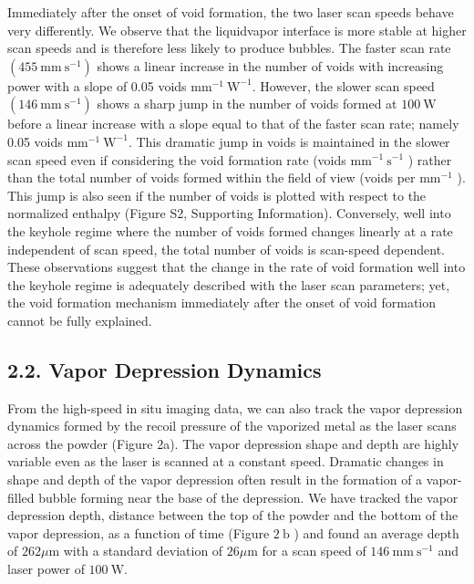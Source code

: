 \documentclass[10pt]{article}
\begin{document}
Immediately after the onset of void formation, the two laser scan speeds behave very differently. We observe that the liquidvapor interface is more stable at higher scan speeds and is therefore less likely to produce bubbles. The faster scan rate $\left(455 \mathrm{~mm} \mathrm{~s}^{-1}\right)$ shows a linear increase in the number of voids with increasing power with a slope of 0.05 voids $\mathrm{mm}^{-1} \mathrm{~W}^{-1}$. However, the slower scan speed $\left(146 \mathrm{~mm} \mathrm{~s}^{-1}\right)$ shows a sharp jump in the number of voids formed at $100 \mathrm{~W}$ before a linear increase with a slope equal to that of the faster scan rate; namely 0.05 voids $\mathrm{mm}^{-1} \mathrm{~W}^{-1}$. This dramatic jump in voids is maintained in the slower scan speed even if considering the void formation rate (voids $\mathrm{mm}^{-1} \mathrm{~s}^{-1}$ ) rather than the total number of voids formed within the field of view (voids per $\mathrm{mm}^{-1}$ ). This jump is also seen if the number of voids is plotted with respect to the normalized enthalpy (Figure S2, Supporting Information). Conversely, well into the keyhole regime where the number of voids formed changes linearly at a rate independent of scan speed, the total number of voids is scan-speed dependent. These observations suggest that the change in the rate of void formation well into the keyhole regime is adequately described with the laser scan parameters; yet, the void formation mechanism immediately after the onset of void formation cannot be fully explained.

\subsection*{2.2. Vapor Depression Dynamics}
From the high-speed in situ imaging data, we can also track the vapor depression dynamics formed by the recoil pressure of the vaporized metal as the laser scans across the powder (Figure 2a). The vapor depression shape and depth are highly variable even as the laser is scanned at a constant speed. Dramatic changes in shape and depth of the vapor depression often result in the formation of a vapor-filled bubble forming near the base of the depression. We have tracked the vapor depression depth, distance between the top of the powder and the bottom of the vapor depression, as a function of time (Figure $2 \mathrm{~b}$ ) and found an average depth of $262 \mu \mathrm{m}$ with a standard deviation of $26 \mu \mathrm{m}$ for a scan speed of $146 \mathrm{~mm} \mathrm{~s}^{-1}$ and laser power of $100 \mathrm{~W}$.
\end{document}
